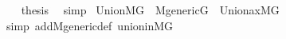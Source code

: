 \begin{isabellebody}
\ \ \isamarkupfalse%
\ {\isacharquery}{\kern0pt}thesis\ \isamarkupfalse%
\ simp\isanewline
{}\isamarkupfalse%
%
\endisatagproof
{\isafoldproof}%
%
\isadelimproof
\isanewline
%
\endisadelimproof
\isanewline
{}\isamarkupfalse%
\ Union{\isacharunderscore}{\kern0pt}MG\ {\isacharcolon}{\kern0pt}\ {\isachardoublequoteopen}M{\isacharunderscore}{\kern0pt}generic{\isacharparenleft}{\kern0pt}G{\isacharparenright}{\kern0pt}\ {\isasymLongrightarrow}\ Union{\isacharunderscore}{\kern0pt}ax{\isacharparenleft}{\kern0pt}{\isacharhash}{\kern0pt}{\isacharhash}{\kern0pt}M{\isacharbrackleft}{\kern0pt}G{\isacharbrackright}{\kern0pt}{\isacharparenright}{\kern0pt}{\isachardoublequoteclose}\isanewline
%
\isadelimproof
\ \ %
\endisadelimproof
%
\isatagproof
{}\isamarkupfalse%
\ {\isacharparenleft}{\kern0pt}simp\ add{\isacharcolon}{\kern0pt}M{\isacharunderscore}{\kern0pt}generic{\isacharunderscore}{\kern0pt}def\ union{\isacharunderscore}{\kern0pt}in{\isacharunderscore}{\kern0pt}MG{\isacharparenright}{\kern0pt}%
\endisatagproof
{\isafoldproof}%
%
\isadelimproof
\isanewline
%
\endisadelimproof
\isanewline
{}\isamarkupfalse%
\ \isanewline
%
\isadelimtheory
%
\endisadelimtheory
%
\isatagtheory
{}\isamarkupfalse%
%
\endisatagtheory
{\isafoldtheory}%
%
\isadelimtheory
%
\endisadelimtheory
%
\end{isabellebody}%
\endinput
